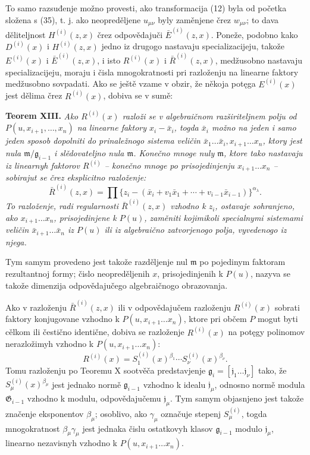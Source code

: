 \documentclass[11pt]{article}
\providecommand{\Gmod}{\mathfrak G}
\providecommand{\mideal}{\mathfrak m}
\providecommand{\gideal}{\mathfrak g}
\providecommand{\jideal}{\mathfrak j}
\begin{document}
To samo razsuđenje možno provesti, ako transformacija (12) byla od početka složena s (35), t. j. ako neopreděljene $u_{\mu\nu}$ byly zaměnjene črez $w_{\mu\nu}$; to dava děliteljnost $H^{(i)}(z,x)$ črez odpovědajuči $\bar E^{(i)}(z,x)$. Poneže, podobno kako $D^{(i)}(x)$ i $H^{(i)}(z,x)$ jedno iz drugogo nastavaju specializacijeju, takože $E^{(i)}(x)$ i $\bar E^{(i)}(z,x)$, i isto $R^{(i)}(x)$ i $\bar R^{(i)}(z,x)$, medžusobno nastavaju specializacijeju, moraju i čisla mnogokratnosti pri razloženju na linearne faktory medžusobno sovpadati. Ako se ještě vzame v obzir, že někoja potęga $E^{(i)}(x)$ jest dělima črez $R^{(i)}(x)$, dobiva se v sumě:

\medskip
\noindent\textbf{Teorem XIII.} {\itshape Ako $R^{(i)}(x)$ razloži se v algebraičnom razširiteljnem polju od $P(u,x_{i+1},\ldots,x_n)$ na linearne faktory $x_i-\bar x_i$, togda $\bar x_i$ možno na jeden i samo jeden sposob dopolniti do prinaležnogo sistema veličin $\bar x_1\ldots\bar x_i,x_{i+1}\ldots x_n$, ktory jest nula $\mideal/\gideal_{i-1}$ i slědovateljno nula $\mideal$. Konečno mnoge nuly $\mideal$, ktore tako nastavaju iz linearnyh faktorov $R^{(i)}$ -- konečno mnoge po prisojedinjenju $x_{i+1}\ldots x_n$ -- sobirajut se črez eksplicitno razloženje:}
\begin{equation}
 \bar R^{(i)}(z,x)=\prod\{z_i-(\bar x_i+v_1\bar x_1+\cdots+v_{i-1}\bar x_{i-1})\}^{\alpha_\lambda}.
\tag{36}
\end{equation}
{\itshape To razloženje, radi regularnosti $\bar R^{(i)}(z,x)$ vzhodno k $z_i$, ostavaje sohranjeno, ako $x_{i+1}\ldots x_n$, prisojedinjene k $P(u)$, zaměniti kojimikoli specialnymi sistemami veličin $\bar x_{i+1}\ldots\bar x_n$ iz $P(u)$ ili iz algebraično zatvorjenogo polja, vyvedenogo iz njega.}

Tym samym provedeno jest takože razděljenje nul $\mideal$ po pojedinym faktoram rezultantnoj formy; čislo neopreděljenih $x$, prisojedinjenih k $P(u)$, nazyva se takože dimenzija odpovědajučego algebraičnogo obrazovanja.

Ako v razloženju $\bar R^{(i)}(z,x)$ ili v odpovědajučem razloženju $R^{(i)}(x)$ sobrati faktory konjugovane vzhodno k $P(u,x_{i+1}\ldots x_n)$, ktore pri občem $P$ mogut byti cělkom ili čestično identične, dobiva se razloženje $R^{(i)}(x)$ na potęgy polinomov nerazložimyh vzhodno k $P(u,x_{i+1}\ldots x_n)$:
\[
 R^{(i)}(x)=S^{(i)}_1(x)^{\beta_1}\cdots S^{(i)}_\nu(x)^{\beta_\nu}.
\]
Tomu razloženju po Teoremu X sootvěča predstavjenje $\gideal_i=[\jideal_1\ldots\jideal_\nu]$ tako, že $S^{(i)}_\mu(x)^{\beta_\mu}$ jest jednako normě $\gideal_{i-1}$ vzhodno k idealu $\jideal_\mu$, odnosno normě modula $\Gmod_{i-1}$ vzhodno k modulu, odpovědajučemu $\jideal_\mu$. Tym samym objasnjeno jest takože značenje eksponentov $\beta_\mu$; osoblivo, ako $\gamma_\mu$ označuje stepenj $S^{(i)}_\mu$, togda mnogokratnost $\beta_\mu\gamma_\mu$ jest jednaka čislu ostatkovyh klasov $\gideal_{i-1}$ modulo $\jideal_\mu$, linearno nezavisnyh vzhodno k $P(u,x_{i+1}\ldots x_n)$.
\end{document}
